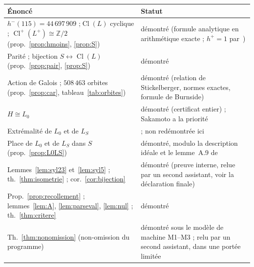 \documentclass[11pt,a4paper]{amsart}
\theoremstyle{plain}
\theoremstyle{definition}
\numberwithin{equation}{section}
\newcommand{\Z}{\mathbb{Z}}
\DeclareMathOperator{\Cl}{Cl}
\newcommand{\Clp}{\Cl^{+}}
\newcommand{\Lz}{L_{0}}
\newcommand{\LS}{L_{S}}
\begin{document}
\begin{center}\small\renewcommand{\arraystretch}{1.25}
\begin{tabular}{>{\raggedright\arraybackslash}p{7.3cm}>{\raggedright\arraybackslash}p{6.9cm}}
\toprule
Énoncé & Statut \\
\midrule
$h^-(115)=44\,697\,909$ ;$\Cl(L)$ cyclique ; $\Clp(L^+)\cong\Z/2$ (prop.~\ref{prop:hmoins}, \ref{prop:S}) & démontré (formule analytique en arithmétique exacte ; $h^+=1$ par~\cite{Mil14}) \\
Parité ; bijection $S\leftrightarrow\Cl(L)$ (prop.~\ref{prop:pair}, \ref{prop:S}) & démontré \\
Action de Galois ; $508\,463$ orbites (prop.~\ref{prop:car}, tableau~\ref{tab:orbites}) & démontré (relation de Stickelberger, normes exactes, formule de Burnside) \\
$H\cong\Lz$ & démontré (certificat entier) ; Sakamoto a la priorité \\
Extrémalité de $\Lz$ et de $\LS$ & \cite[prop.~5.5 et \S5]{Sak26} ; non redémontrée ici \\
Place de $\Lz$ et de $\LS$ dans $S$ (prop.~\ref{prop:L0LS}) & démontré, modulo la description idéale et le lemme~A.9 de~\cite{Sak26} \\
Lemmes~\ref{lem:syl23} et~\ref{lem:syl5} ; th.~\ref{thm:isometrie} ; cor.~\ref{cor:bijection} & démontré (preuve interne, relue par un second assistant, voir la déclaration finale) \\
Prop.~\ref{prop:recollement} ; lemmes~\ref{lem:A}, \ref{lem:parseval}, \ref{lem:nul} ; th.~\ref{thm:critere} & démontré \\
Th.~\ref{thm:nonomission} (non-omission du programme) & démontré sous le modèle de machine M1--M3 ; relu par un second assistant, dans une portée limitée \\
\bottomrule
\end{tabular}


\end{center}
\end{document}
